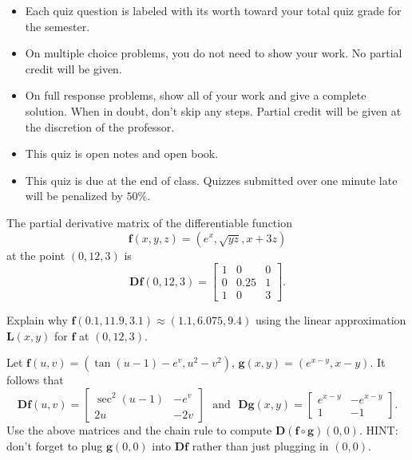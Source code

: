 \documentclass[12pt]{exam}
\newcommand{\vect}[1]{\ensuremath{\mathbf{#1}}}
\newcommand{\<}{(}
\renewcommand{\>}{)}
\begin{document}
\begin{center}
\end{center}
\vspace{0.1in}

\vspace{12pt}

\begin{itemize}
  \item Each quiz question is labeled with its worth toward your total quiz
        grade for the semester.
  \item On multiple choice problems, you do not need to show your work. No
        partial credit will be given.
  \item On full response problems, show all of your work and give a
        complete solution. When in doubt, don't skip any steps. Partial
        credit will be given at the discretion of the professor.
  \item This quiz is open notes and open book.
  \item This quiz is due at the end of class. Quizzes submitted over one minute
        late will be penalized by \(50\%\).
\end{itemize}

\newpage

\begin{questions}

\question[10]
The partial derivative matrix of the differentiable function
\[
  \vect f(x,y,z) = \<e^x,\sqrt{yz},x+3z\>
\]
at the point \((0,12,3)\) is
\[
  \vect D\vect f(0,12,3)
    =
  \left[\begin{matrix}
    1 & 0 & 0 \\
    0 & 0.25 & 1 \\
    1 & 0 & 3
  \end{matrix}\right]
.\]

Explain why \(\vect f(0.1,11.9,3.1)\approx \<1.1,6.075,9.4\>\) using
the linear approximation \(\vect L(x,y)\) for \(\vect f\) at \((0,12,3)\).


\vfill
\newpage

\question[10]
Let \(\vect f(u,v)=\<\tan(u-1)-e^v,u^2-v^2\>\),
\(\vect g(x,y)=\<e^{x-y},x-y\>\). It follows that
\[
  \vect D\vect f(u,v)
    =
  \left[\begin{matrix}
    \sec^2(u-1) & -e^v \\
    2u & -2v
  \end{matrix}\right]
  \text{~~and~~}
  \vect D\vect g(x,y)
    =
  \left[\begin{matrix}
    e^{x-y} & -e^{x-y} \\
    1 & -1
  \end{matrix}\right]
.\]
Use the above matrices and the chain rule to compute
\(\vect D(\vect f\circ\vect g)(0,0)\). HINT: don't forget to plug
\(\vect g(0,0)\) into \(\vect D\vect f\) rather than just plugging in \((0,0)\).


\vfill
\end{questions}
\end{document}

